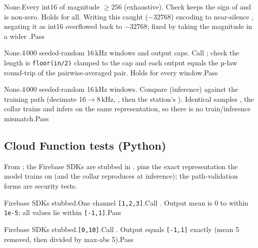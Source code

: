 {None.}{Every int16 of magnitude $\geq 256$ (exhaustive).}
{Check  keeps the sign of  and is non-zero.}
{Holds for all. Writing this caught  ($-32768$) encoding to near-silence , negating it as int16 overflowed back to $-32768$; fixed by taking the magnitude in a wider .}{Pass}

{None.}{4\,000 seeded-random 16\,kHz windows and output caps.}
{Call ; check the length is \texttt{floor(in/2)} clamped to the cap and each output equals the µ-law round-trip of the pairwise-averaged pair.}
{Holds for every window.}{Pass}

{None.}{4\,000 seeded-random 16\,kHz windows.}
{Compare  (inference) against the training path (decimate 16$\to$8\,kHz, , then the station's ).}
{Identical samples , the collar trains and infers on the same representation, so there is no train/inference mismatch.}{Pass}

\subsection{Cloud Function tests (Python)}

From ; the Firebase SDKs are stubbed in .
 pins the exact representation the model trains on (and the collar reproduces at
inference); the  path-validation forms are security tests.

{Firebase SDKs stubbed.}{One channel \texttt{[1,2,3]}.}{Call .}
{Output mean is 0 to within \texttt{1e-5}; all values lie within \texttt{[-1,1]}.}{Pass}

{Firebase SDKs stubbed.}{\texttt{[0,10]}.}{Call .}
{Output equals \texttt{[-1,1]} exactly (mean 5 removed, then divided by max-abs 5).}{Pass}

